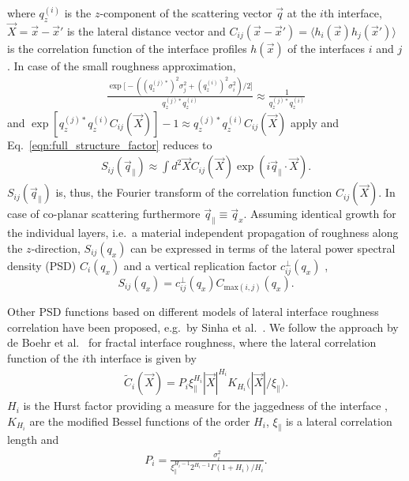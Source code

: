 where $q_z^{(i)}$ is the $z$-component of the scattering vector $\vec{q}$ at the $i$th interface, $\vec{X} = \vec{x} - \vec{x}'$ is the lateral distance vector and $C_{ij}(\vec{x}-\vec{x}') = \langle h_i(\vec{x}) h_j(\vec{x}') \rangle$ is the correlation function of the interface profiles $h(\vec{x})$ of the interfaces $i$ and $j$ \cite{PhysRevB.51.5297,PhysRevB.53.6048}. In case of the small roughness approximation, \begin{align}
\frac{\exp \Big[-((q_z^{(j)*})^2 \sigma_j^2 + (q_z^{(i)})^{2} \sigma_i^2)/2\Big]}{q_z^{(j)*} q_z^{(i)}} \approx \frac{1}{q_z^{(j)*} q_z^{(i)}}
\end{align}
and $\exp [q_z^{(j)*} q_z^{(i)} C_{ij}(\vec{X})]-1 \approx q_z^{(j)*} q_z^{(i)} C_{ij}(\vec{X})$ apply and Eq.~\eqref{eqn:full_structure_factor} reduces to
\begin{align}
S_{ij}(\vec{q}_\parallel) \approx \int d^2 \vec{X} C_{ij}(\vec{X}) \exp(i \vec{q}_\parallel \cdot \vec{X}) \text{.} \label{eqn:reduced_structure_factor}
\end{align}
$S_{ij}(\vec{q}_\parallel)$ is, thus, the Fourier transform of the correlation function $C_{ij}(\vec{X})$. In case of co-planar scattering furthermore $\vec{q}_\parallel \equiv \vec{q}_x$.
Assuming identical growth for the individual layers, i.e.~a material independent propagation of roughness along the $z$-direction, $S_{ij}(q_x)$ can be expressed in terms of the lateral power spectral density (PSD) $C_{i}(q_x)$ and a vertical replication factor $c_{ij}^{\perp}(q_x)$ \cite{spiller1993multilayer},
\begin{equation}
        S_{ij}(q_x) = c_{ij}^{\perp}(q_x) C_{\text{max}(i,j)}(q_x)\text{.} \label{eqn:factorized_structure_factor}
\end{equation}

Other PSD functions based on different models of lateral interface roughness correlation have been proposed, e.g.~by Sinha et al.~\cite{PhysRevB.38.2297}. We follow the approach by de Boehr et al.~\cite{deBoerLateralCorrelation,PhysRevB.51.5297} for fractal interface roughness, where the lateral correlation function of the $i$th interface is given by
\begin{align}
\tilde{C}_i(\vec{X}) = P_i \xi_\parallel^{H_i} |\vec{X}|^{H_i} K_{H_i}\Big(|\vec{X}|/\xi_\parallel\Big) \text{.} \label{eqn:lateral_correlation_function}
\end{align}
$H_i$ is the Hurst factor providing a measure for the jaggedness of the interface \cite{PhysRevB.38.2297}, $K_{H_i}$ are the modified Bessel functions of the order $H_i$, $\xi_\parallel$ is a lateral correlation length and
\begin{align}
P_i = \frac{\sigma_i^2}{\xi_\parallel^{H_i-1} 2^{H_i-1} \Gamma(1+H_i)/H_i}\text{.}
\end{align}

